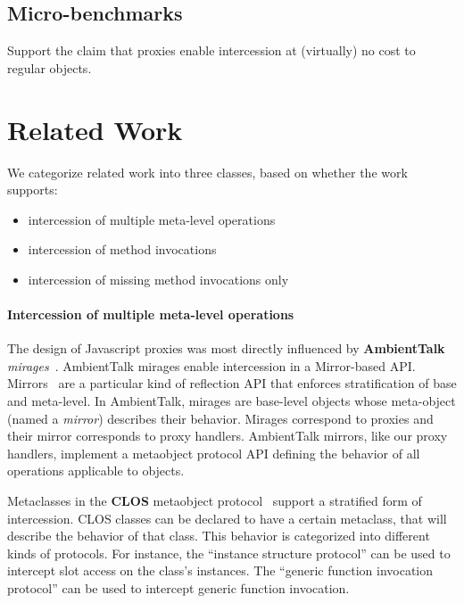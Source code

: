 \documentclass{acm_proc_article-sp}
\begin{document}
\subsection{Micro-benchmarks}
Support the claim that proxies enable intercession at (virtually) no cost to regular objects.

\section{Related Work}

We categorize related work into three classes, based on whether the work supports:
\begin{itemize}
  \item intercession of multiple meta-level operations
  \item intercession of method invocations
  \item intercession of missing method invocations only
\end{itemize}


\paragraph{Intercession of multiple meta-level operations}

The design of Javascript proxies was most directly influenced by \textbf{AmbientTalk} \emph{mirages}~\cite{mirages_dls_07,spe_journal_08}. AmbientTalk mirages enable intercession in a Mirror-based API. Mirrors~\cite{bracha_04_mirrors_oopsla} are a particular kind of reflection API that enforces stratification of base and meta-level. In AmbientTalk, mirages are base-level objects whose meta-object (named a \emph{mirror}) describes their behavior. Mirages correspond to proxies and their mirror corresponds to proxy handlers. AmbientTalk mirrors, like our proxy handlers, implement a metaobject protocol API defining the behavior of all operations applicable to objects.

Metaclasses in the \textbf{CLOS} metaobject protocol~\cite{clos} support a stratified form of intercession. CLOS classes can be declared to have a certain metaclass, that will describe the behavior of that class. This behavior is categorized into different kinds of protocols. For instance, the ``instance structure protocol'' can be used to intercept slot access on the class's instances. The ``generic function invocation protocol'' can be used to intercept generic function invocation.
\end{document}
